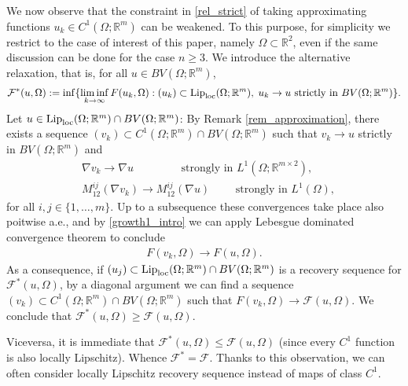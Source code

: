 \documentclass[a4paper,11pt]{article}
\numberwithin{equation}{section}
\newcommand{\Om}{\Omega}
\newcommand{\R}{\mathbb{R}}
\begin{document}
We now observe that the constraint in \eqref{rel_strict} of taking approximating functions $u_k\in C^1(\Om;\R^m)$ can be weakened. To this purpose, for simplicity we restrict to the case of interest of this paper, namely $\Om\subset\R^2$, even if the same discussion can be done for the case $n\geq3$.
We introduce the alternative relaxation, that is, for all $u\in BV(\Om;\R^m)$,
\begin{align}
	\mathcal F^*(u,\Om):=\inf\{\liminf_{k\rightarrow\infty}F(u_k,\Om):(u_k)\subset \text{{\rm Lip}}_{\text{{\rm loc}}}(\Om;\R^m),\;u_k\rightarrow u\text{ strictly in }BV(\Om;\R^m)\}.
\end{align}
Let $u\in \text{{\rm Lip}}_{\text{{\rm loc}}}(\Om;\R^m)\cap BV(\Om;\R^m)$: By Remark \ref{rem_approximation}, there exists a sequence $(v_k)\subset C^1(\Om;\R^m)\cap BV(\Om;\R^m)$ such that $v_k\rightarrow u$ strictly in $BV(\Om;\R^m)$ and
\begin{align*}
&\nabla v_k\rightarrow \nabla u\qquad \qquad \text{ strongly in } L^1(\Om;\R^{m\times 2}),\\
&M_{12}^{ij}(\nabla v_k)\rightarrow M_{12}^{ij}(\nabla u)\qquad \text{ strongly in }L^1(\Om),
\end{align*}
 for all $i,j\in \{1,\dots,m\}$. Up to a subsequence these convergences take place also poitwise a.e., and by \eqref{growth1_intro} we can apply Lebesgue dominated convergence theorem to conclude
 \begin{align}
F(v_k,\Om)\rightarrow F(u,\Om).
 \end{align}
 As a consequence, if $(u_j)\subset \text{{\rm Lip}}_{\text{{\rm loc}}}(\Om;\R^m)\cap  BV(\Om;\R^m)$ is a recovery sequence for $\mathcal F^*(u,\Om)$, by a diagonal argument we can find a sequence $(v_k)\subset C^1(\Om;\R^m)\cap BV(\Om;\R^m)$ such that 
$
  F(v_k,\Om)\rightarrow \mathcal F(u,\Om).
 $ We conclude that $\mathcal F^*(u,\Om)\geq \mathcal F(u,\Om)$.
 
 Viceversa,  it is immediate that $\mathcal F^*(u,\Om)\leq \mathcal F(u,\Om)$ (since every $C^1$ function is also locally Lipschitz).  Whence $\mathcal F^*=\mathcal F$.
 Thanks to this observation, we can often consider locally Lipschitz recovery sequence instead of maps of class $C^1$. 
 
\end{document}
